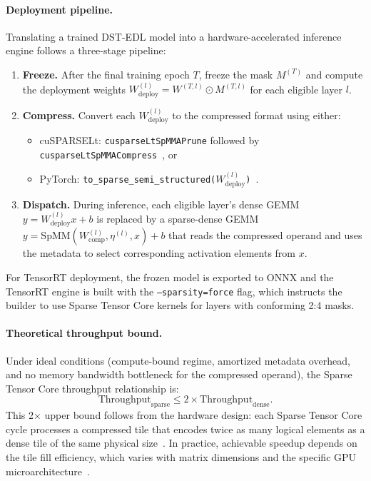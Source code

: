 \paragraph{Deployment pipeline.}
Translating a trained DST-EDL model into a hardware-accelerated inference
engine follows a three-stage pipeline:
\begin{enumerate}[leftmargin=*,itemsep=1pt,parsep=0pt]
    \item \textbf{Freeze.} After the final training epoch $T$, freeze the
          mask $M^{(T)}$ and compute the deployment weights
          $W_{\mathrm{deploy}}^{(l)}=W^{(T,l)}\odot M^{(T,l)}$ for each
          eligible layer $l$.
    \item \textbf{Compress.} Convert each
          $W_{\mathrm{deploy}}^{(l)}$ to the compressed format using either:
          \begin{itemize}[leftmargin=*,itemsep=0pt]
              \item cuSPARSELt:
                    \texttt{cusparseLtSpMMAPrune} followed by
                    \texttt{cusparseLtSpMMACompress}~\cite{nvidiacusparselt}, or
              \item PyTorch:
                    \texttt{to\_sparse\_semi\_structured($W_{\mathrm{deploy}}^{(l)}$)}~\cite{pytorchsemistructured}.
          \end{itemize}
    \item \textbf{Dispatch.} During inference, each eligible layer's
          dense GEMM $y=W_{\mathrm{deploy}}^{(l)}x+b$ is replaced by a
          sparse-dense GEMM
          $y=\mathrm{SpMM}(W_{\mathrm{comp}}^{(l)},\eta^{(l)},x)+b$
          that reads the compressed operand and uses the metadata to select
          corresponding activation elements from $x$.
\end{enumerate}
For TensorRT deployment, the frozen model is exported to ONNX and the
TensorRT engine is built with the \texttt{--sparsity=force} flag, which
instructs the builder to use Sparse Tensor Core kernels for layers with
conforming 2:4 masks.

\paragraph{Theoretical throughput bound.}
Under ideal conditions (compute-bound regime, amortized metadata overhead,
and no memory bandwidth bottleneck for the compressed operand), the Sparse
Tensor Core throughput relationship is:
\begin{equation}\label{eq:sparse_throughput}
    \mathrm{Throughput}_{\mathrm{sparse}}
    \leq
    2\times\mathrm{Throughput}_{\mathrm{dense}}.
\end{equation}
This 2$\times$ upper bound follows from the hardware design: each Sparse
Tensor Core cycle processes a compressed tile that encodes twice as many
logical elements as a dense tile of the same physical
size~\cite{mishra2021accelerating}. In practice, achievable speedup depends
on the tile fill efficiency, which varies with matrix dimensions and the
specific GPU microarchitecture~\cite{hu2024accelerating}.

